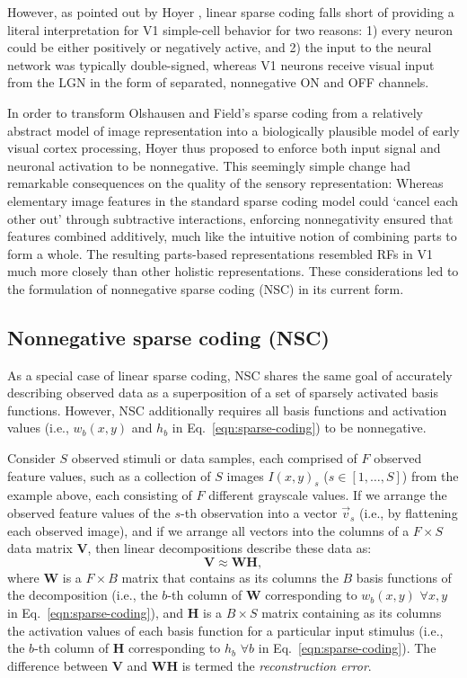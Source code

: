 However, as pointed out by Hoyer \cite{Hoyer2003}, 
linear sparse coding falls short of providing a literal interpretation
for \ac{V1} simple-cell behavior for two reasons:
1) every neuron could be either positively or negatively active, and
2) the input to the neural network was typically double-signed,
whereas \ac{V1} neurons receive visual input from the \ac{LGN} 
in the form of separated, nonnegative ON and OFF channels.

In order to transform Olshausen and Field's sparse coding
from a relatively abstract model of image representation 
into a biologically plausible model of early visual cortex processing,
Hoyer \cite{Hoyer2002,Hoyer2003} thus proposed to enforce
both input signal and neuronal activation to be nonnegative.
This seemingly simple change had remarkable consequences 
on the quality of the sensory representation:
Whereas elementary image features in the standard sparse coding model
could `cancel each other out' through subtractive interactions,
enforcing nonnegativity ensured that features combined additively,
much like the intuitive notion of combining parts to form a whole.
The resulting parts-based representations resembled \acp{RF} in \ac{V1} 
much more closely than other holistic representations.
These considerations led to the formulation of nonnegative sparse coding (\ac{NSC}) in its current form.


\subsection*{Nonnegative sparse coding (NSC)}

As a special case of linear sparse coding,
\ac{NSC} shares the same goal of accurately describing observed data
as a superposition of a set of sparsely activated basis functions.
However, \ac{NSC} additionally requires 
all basis functions and activation values
(i.e., $w_b(x,y)$ and $h_b$ in Eq.~\ref{eqn:sparse-coding})
to be nonnegative.

Consider $S$ observed stimuli or data samples,
each comprised of $F$ observed feature values,
such as a collection of $S$ images $I(x,y)_s$ ($s \in [1, \ldots, S]$)
from the example above,
each consisting of $F$ different grayscale values.
If we arrange the observed feature values of the $s$-th observation into
a vector $\vec{v}_s$ (i.e., by flattening each observed image),
and if we arrange all vectors into the columns 
of a $F \times S$ data matrix \textbf{V},
then linear decompositions describe these data as:
\begin{equation}
\mathbf{V} \approx \mathbf{WH},
\label{eqn:linear-decomposition}
\end{equation}
where \textbf{W} is a $F \times B$ matrix that contains as its columns
the $B$ basis functions of the decomposition
(i.e., the $b$-th column of \textbf{W} corresponding to 
$w_b(x,y)$ $\forall x,y$ in Eq.~\ref{eqn:sparse-coding}),
and \textbf{H} is a $B \times S$ matrix containing
as its columns the activation values 
of each basis function for a particular input stimulus
(i.e., the $b$-th column of \textbf{H} corresponding to 
$h_b$ $\forall b$ in Eq.~\ref{eqn:sparse-coding}).
The difference between \textbf{V} and \textbf{WH} is termed
the \emph{reconstruction error}.

